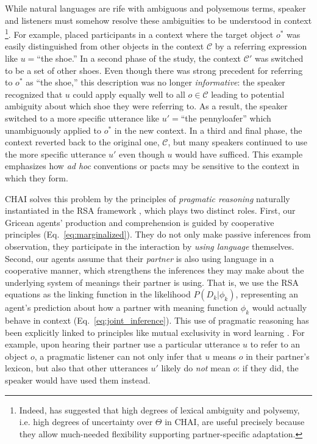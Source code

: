 While natural languages are rife with ambiguous and polysemous terms, speaker and listeners must somehow resolve these ambiguities to be understood in context \cite{PiantadosiTilyGibson12_Ambiguity}\footnote{Indeed,  has suggested that high degrees of lexical ambiguity and polysemy, i.e. high degrees of uncertainty over $\Theta$ in CHAI, are useful precisely because they allow much-needed flexibility supporting partner-specific adaptation.}. 
For example,  placed participants in a context where the target object $o^*$ was easily distinguished from other objects in the context $\mathcal{C}$ by a referring expression like $u=$``the shoe.''
In a second phase of the study, the context $\mathcal{C}'$ was switched to be a set of other shoes.
Even though there was strong precedent for referring to $o^*$ as ``the shoe,'' this description was no longer \emph{informative}: the speaker recognized that $u$ could apply equally well to all $o\in\mathcal{C}$ leading to potential ambiguity about which shoe they were referring to.
As a result, the speaker switched to a more specific utterance like $u'=$``the pennyloafer'' which unambiguously applied to $o^*$ in the new context.
In a third and final phase, the context reverted back to the original one, $\mathcal{C}$, but many speakers continued to use the more specific utterance $u'$ even though $u$ would have sufficed.
This example emphasizes how \emph{ad hoc} conventions or pacts may be sensitive to the context in which they form.

CHAI solves this problem by the principles of \textit{pragmatic reasoning} naturally instantiated in the RSA framework \cite{FrankGoodman12_PragmaticReasoningLanguageGames}, which plays two distinct roles.
First, our Gricean agents'  production and comprehension is guided by cooperative principles (Eq.~\ref{eq:marginalized}).
They do not only make passive inferences from observation, they participate in the interaction by \emph{using language} themselves.
Second, our agents assume that their \emph{partner} is also using language in a cooperative manner, which strengthens the inferences they may make about the underlying system of meanings their partner is using.
That is, we use the RSA equations as the linking function in the likelihood $P(D_k | \phi_k)$, representing an agent's prediction about how a partner with meaning function $\phi_k$ would actually behave in context (Eq.~\ref{eq:joint_inference}). 
This use of pragmatic reasoning has been explicitly linked to principles like mutual exclusivity in word learning \cite{bloom2002children,FrankGoodmanTenenbaum09_Wurwur,SmithGoodmanFrank13_RecursivePragmaticReasoningNIPS,gulordava2020one,ohmerreinforcement}.
For example, upon hearing their partner use a particular utterance $u$ to refer to an object $o$, a pragmatic listener can not only infer that $u$ means $o$ in their partner's lexicon, but also that other utterances $u'$ likely do \emph{not} mean $o$: if they did, the speaker would have used them instead.

